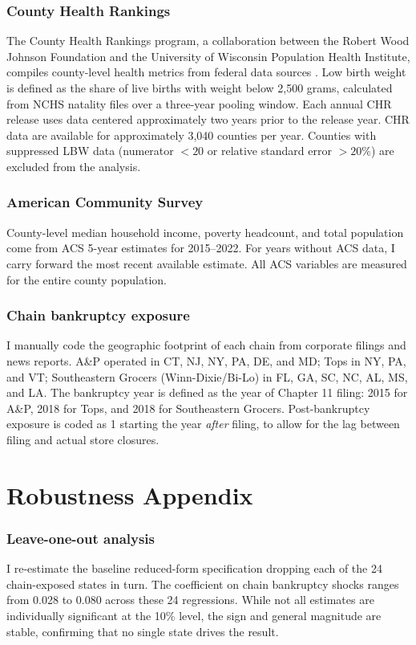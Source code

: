 \documentclass[12pt]{article}
\begin{document}
\subsubsection*{County Health Rankings} The County Health Rankings program, a collaboration between the Robert Wood Johnson Foundation and the University of Wisconsin Population Health Institute, compiles county-level health metrics from federal data sources \citep{remington2015county}. Low birth weight is defined as the share of live births with weight below 2,500 grams, calculated from NCHS natality files over a three-year pooling window. Each annual CHR release uses data centered approximately two years prior to the release year. CHR data are available for approximately 3,040 counties per year. Counties with suppressed LBW data (numerator $< 20$ or relative standard error $> 20\%$) are excluded from the analysis.

\subsubsection*{American Community Survey} County-level median household income, poverty headcount, and total population come from ACS 5-year estimates for 2015--2022. For years without ACS data, I carry forward the most recent available estimate. All ACS variables are measured for the entire county population.

\subsubsection*{Chain bankruptcy exposure} I manually code the geographic footprint of each chain from corporate filings and news reports. A\&P operated in CT, NJ, NY, PA, DE, and MD; Tops in NY, PA, and VT; Southeastern Grocers (Winn-Dixie/Bi-Lo) in FL, GA, SC, NC, AL, MS, and LA. The bankruptcy year is defined as the year of Chapter 11 filing: 2015 for A\&P, 2018 for Tops, and 2018 for Southeastern Grocers. Post-bankruptcy exposure is coded as 1 starting the year \textit{after} filing, to allow for the lag between filing and actual store closures.

\section{Robustness Appendix}

\subsubsection*{Leave-one-out analysis} I re-estimate the baseline reduced-form specification dropping each of the 24 chain-exposed states in turn. The coefficient on chain bankruptcy shocks ranges from 0.028 to 0.080 across these 24 regressions. While not all estimates are individually significant at the 10\% level, the sign and general magnitude are stable, confirming that no single state drives the result.
\end{document}
